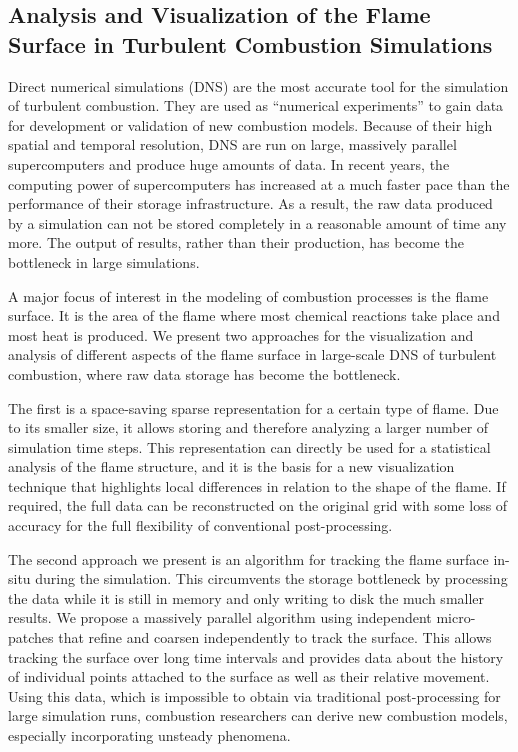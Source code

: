 \subsection{Analysis and Visualization of the Flame Surface in Turbulent
Combustion Simulations} %
\label{sub:contr_flame_vis}
%
Direct numerical simulations (\acs{DNS}) are the most accurate tool
for the simulation of turbulent combustion.
%
They are used as ``numerical experiments'' to gain data for development or
validation of new combustion models.
%
Because of their high spatial and temporal resolution, \ac{DNS} are run on
large, massively parallel supercomputers and produce huge amounts of data.
%
In recent years, the computing power of supercomputers has increased at a much
faster pace than the performance of their storage infrastructure.
%
As a result, the raw data produced by a simulation can not be stored completely
in a reasonable amount of time any more.
%
The output of results, rather than their production, has become the bottleneck
in large simulations.
%

%
A major focus of interest in the modeling of combustion processes is the flame
surface.
%
It is the area of the flame where most chemical reactions take place and most
heat is produced.
%
We present two approaches for the visualization and analysis of different
aspects of the flame surface in large-scale \ac{DNS} of turbulent combustion,
where raw data storage has become the bottleneck.
%

%
The first is a space-saving sparse representation for a certain type of flame.
%
Due to its smaller size, it allows storing and therefore analyzing a larger
number of simulation time steps.
%
This representation can directly be used for a statistical analysis of the flame
structure, and it is the basis for a new visualization technique that highlights
local differences in relation to the shape of the flame.
%
If required, the full data can be reconstructed on the original grid with some
loss of accuracy for the full flexibility of conventional post-processing.
%

%
The second approach we present is an algorithm for tracking the flame surface
in-situ during the simulation.
%
This circumvents the storage bottleneck by processing the data while it is still
in memory and only writing to disk the much smaller results.
%
We propose a massively parallel algorithm using independent micro-patches that
refine and coarsen independently to track the surface.
%
This allows tracking the surface over long time intervals and provides data
about the history of individual points attached to the surface as well as their
relative movement.
%
Using this data, which is impossible to obtain via traditional post-processing
for large simulation runs, combustion researchers can derive new combustion
models, especially incorporating unsteady phenomena.
%
%

